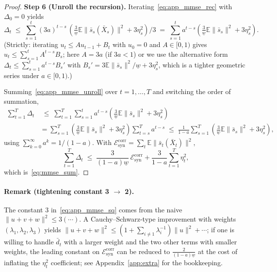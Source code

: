 \documentclass{article}
\theoremstyle{plain}
\theoremstyle{definition}
\theoremstyle{remark}
\begin{document}
\begin{proof}
\textbf{Step 6 (Unroll the recursion).}
Iterating~\eqref{eq:app_mmse_rec} with \(\Delta_0 = 0\) yields
\begin{equation}
\Delta_t
\;\le\;
\sum_{s=1}^{t}(3a)^{t-s}\,\left(\tfrac{3}{\underline w}\mathbb{E}\|\bar s_s(\bar X_s)\|^2 + 3\eta_s^2\right)\bigg/ 3
\;=\;
\sum_{s=1}^{t}a^{t-s}\!\left(\tfrac{3}{\underline w}\mathbb{E}\|\bar s_s\|^2 + 3\eta_s^2\right).
\label{eq:app_mmse_unroll}
\end{equation}
(Strictly: iterating \(u_t\le A u_{t-1} + B_t\) with \(u_0=0\) and \(A\in[0,1)\)
gives \(u_t \le \sum_{s=1}^t A^{t-s}B_s\); here \(A=3a\) (if \(3a<1\)) or we
use the alternative form \(\Delta_t \le \sum_{s=1}^t a^{t-s} B_s'\) with
\(B_s' = 3\mathbb{E}\|\bar s_s\|^2/\underline w + 3\eta_s^2\), which is a
tighter geometric series under \(a\in[0,1)\).)

Summing~\eqref{eq:app_mmse_unroll} over \(t=1,\dots,T\) and switching the
order of summation,
\begin{align*}
\sum_{t=1}^T \Delta_t
&\;\le\;
\sum_{t=1}^T \sum_{s=1}^t a^{t-s}\!\left(\tfrac{3}{\underline w}\mathbb{E}\|\bar s_s\|^2 + 3\eta_s^2\right) \\
&= \sum_{s=1}^T\!\left(\tfrac{3}{\underline w}\mathbb{E}\|\bar s_s\|^2 + 3\eta_s^2\right)\sum_{t=s}^{T}a^{t-s}
\;\le\; \frac{1}{1-a}\sum_{s=1}^T\!\left(\tfrac{3}{\underline w}\mathbb{E}\|\bar s_s\|^2 + 3\eta_s^2\right),
\end{align*}
using \(\sum_{k=0}^{\infty}a^k = 1/(1-a)\). With
\(\mathcal{E}^{\mathrm{corr}}_{\mathrm{syn}} = \sum_t
\mathbb{E}\|\bar s_t(\bar X_t)\|^2\),
\begin{equation}
\sum_{t=1}^T \Delta_t
\;\le\;
\frac{3}{(1-a)\underline w}\,\mathcal{E}^{\mathrm{corr}}_{\mathrm{syn}}
 + \frac{3}{1-a}\sum_{t=1}^T \eta_t^2,
\label{eq:app_mmse_sum}
\end{equation}
which is~\eqref{eq:mmse_sum}.
\end{proof}

\paragraph{Remark (tightening constant 3 \(\to\) 2).}
The constant \(3\) in~\eqref{eq:app_mmse_sq} comes from the naive
\(\|u+v+w\|^2\le 3(\cdots)\). A Cauchy--Schwarz-type improvement with
weights \((\lambda_1,\lambda_2,\lambda_3)\) yields
\(\|u+v+w\|^2 \le (1+\sum_{i\ne 1}\lambda_i^{-1})\|u\|^2 + \cdots\); if one
is willing to handle \(\bar d_t\) with a larger weight and the two other
terms with smaller weights, the leading constant on
\(\mathcal{E}^{\mathrm{corr}}_{\mathrm{syn}}\) can be reduced to
\(\tfrac{2}{(1-a)\underline w}\) at the cost of inflating the \(\eta_t^2\)
coefficient; see Appendix~\ref{app:extra} for the bookkeeping.
\end{document}
